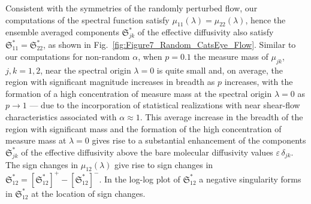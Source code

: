 \documentclass[english,12pt,jmp,graphicx]{revtex4-1}
\newcommand{\figref}[1]{Fig.~\ref{#1}}
\newcommand{\numfigref}[1]{\ref{#1}}
\newcommand{\Sg}{\mathfrak{S}}
\begin{document}
Consistent with the symmetries of the randomly perturbed flow, our
computations of 
the spectral function satisfy $\mu_{11}(\lambda)=\mu_{22}(\lambda)$, hence the
ensemble averaged components $\Sg^*_{jk}$ of the effective diffusivity
also satisfy $\Sg^*_{11}=\Sg^*_{22}$, as shown in
\figref{fig:Figure7_Random_CatsEye_Flow}. Similar to our computations
for non-random $\alpha$, when $p=0.1$ the measure mass of $\mu_{jk}$,
$j,k=1,2$, near the spectral origin $\lambda=0$ is quite small and, on average,
the region with significant magnitude increases in breadth as $p$
increases, with the formation of a high concentration of measure mass at
the spectral origin $\lambda=0$ as $p\to1$ --- due to the
incorporation of statistical realizations with near shear-flow
characteristics associated with $\alpha\approx1$. This average increase in
the breadth of 
the region with  
significant mass and the formation of the high concentration of measure mass at
$\lambda=0$ gives rise to a substantial enhancement of the components
$\Sg^*_{jk}$ of the effective diffusivity above the bare molecular
diffusivity values $\varepsilon\,\delta_{jk}$. The sign changes in
$\mu_{12}(\lambda)$ give rise to sign
changes in $\Sg^*_{12}=[\Sg^*_{12}]^+-[\Sg^*_{12}]^-$. In the
log-log plot of $\Sg^*_{12}$ a negative singularity forms in
$\Sg^*_{12}$ at the location of sign changes.
\end{document}
